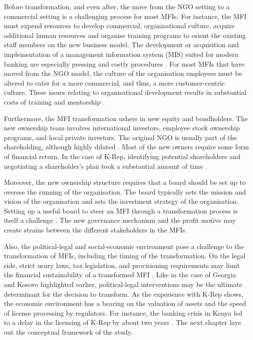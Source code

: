 \documentclass[a4paper, nobind]{templates/ociamthesis}
\begin{document}
Before transformation, and even after, the move from the NGO setting to a commercial setting is a challenging process for most MFIs. For instance, the MFI must expend resources to develop commercial, organisational culture, acquire additional human resources and organise training programs to orient the existing staff members on the new business model. The development or acquisition and implementation of a management information system (MIS) suited for modern banking are especially pressing and costly procedures \autocite{campion1999institutional}. For most MFIs that have moved from the NGO model, the culture of the organisation employees must be altered to cater for a more commercial, and thus, a more customer-centric culture. These issues relating to organisational development results in substantial costs of training and mentorship \autocite{campion1999institutional}.

Furthermore, the MFI transformation ushers in new equity and bondholders. The new ownership team involves international investors, employee stock ownership programs, and local private investors. The original NGO is usually part of the shareholding, although highly diluted \autocite{perilleux2012surplus}. Most of the new owners require some form of financial return. In the case of K-Rep, identifying potential shareholders and negotiating a shareholder's plan took a substantial amount of time \autocite{mersland2009cost,servin2012ownership,campion1999institutional}.

Moreover, the new ownership structure requires that a board should be set up to oversee the running of the organisation. The board typically sets the mission and vision of the organisation and sets the investment strategy of the organisation. Setting up a useful board to steer an MFI through a transformation process is itself a challenge \autocite{mori2014boards}. The new governance mechanism and the profit motive may create strains between the different stakeholders in the MFIs.

Also, the political-legal and social-economic environment pose a challenge to the transformation of MFIs, including the timing of the transformation. On the legal side, strict usury laws, tax legislation, and provisioning requirements may limit the financial sustainability of a transformed MFI \autocite{meagher2006microfinance,johnson2013microfinance}. Like in the case of Georgia and Kosovo highlighted earlier, political-legal interventions may be the ultimate determinant for the decision to transform. As the experience with K-Rep shows, the economic environment has a bearing on the valuation of assets and the speed of license processing by regulators. For instance, the banking crisis in Kenya led to a delay in the licensing of K-Rep by about two years \autocite{campion1999institutional}. The next chapter lays out the conceptual framework of the study.
\end{document}
